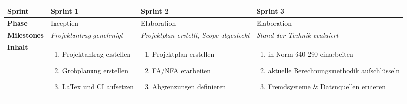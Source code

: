 \begin{landscape}
\begin{longtable}{l p{6.5cm} p{6.5cm} p{6.5cm}}
        \toprule
        \textbf{Sprint}
                                & \textbf{Sprint 1}
                                & \textbf{Sprint 2}
                                & \textbf{Sprint 3} \\

        \midrule
        \textbf{Phase}
                                & Inception
                                & Elaboration
                                & Elaboration \\

        \textbf{Milestones}
                                & \textit{Projektantrag genehmigt}
                                & \textit{Projektplan erstellt, Scope abgesteckt}
                                & \textit{Stand der Technik evaluiert}  \\

        \textbf{Inhalt}
                                & \begin{enumerate}[noitemsep]
                                    \item Projektantrag erstellen
                                    \item Grobplanung erstellen
                                    \item LaTex und \acs{CI} aufsetzen
                                \end{enumerate}
                                & \begin{enumerate}[noitemsep]
                                    \item Projektplan erstellen
                                    \item FA/NFA erarbeiten
                                    \item Abgrenzungen definieren
                                \end{enumerate}
                                & \begin{enumerate}[noitemsep]
                                    \item in Norm 640 290 einarbeiten
                                    \item aktuelle Berechnungsmethodik aufschlüsseln
                                    \item Fremdsysteme \& Datenquellen eruieren
                                \end{enumerate}\\


\end{longtable}
\end{landscape}
